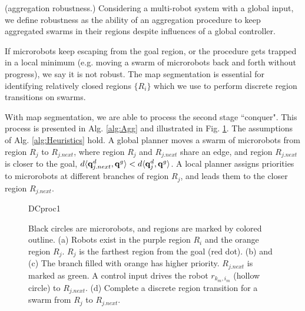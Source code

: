 \begin{definition}\label{def:robust}
	{\normalfont (aggregation robustness.)} Considering a multi-robot system with a global input, we define robustness as the ability of an aggregation procedure to keep aggregated swarms in their regions despite influences of a global controller.
\end{definition}

If microrobots keep escaping from the goal region, or the procedure gets trapped in a local minimum (e.g. moving a swarm of microrobots back and forth without progress), we say it is not robust. 
The map segmentation is essential for identifying relatively closed regions $\{R_i\}$ which we use to perform discrete region transitions on swarms.  
 

With map segmentation, we are able to process the second stage ``conquer". 
This process is presented in Alg. \ref{alg:Agg} and illustrated in Fig. \ref{fig:DCproc}. The assumptions of Alg. \ref{alg:Heuristics} hold. 
A global planner moves a swarm of microrobots from region $R_j$ to $R_{j.next}$, where region $R_j$ and $R_{j.next}$ share an edge, and region $R_{j.next}$ is closer to the goal, $d \langle {\bf q}^d_{j.next}, {\bf q}^g\rangle < d \langle {\bf q}^d_j, {\bf q}^g\rangle$. 
A local planner assigns priorities to microrobots at different branches of region $R_j$, and leads them to the closer region $R_{j.next}$.              

\begin{figure}[h]
	\vspace{1.8 mm}
	\centering
	\begin{overpic}[width=0.8\columnwidth]{DCproc1} %
	\end{overpic}
	
	\caption{\label{fig:DCproc} Black circles are microrobots, and regions are marked by colored outline. (a) Robots exist in the purple region $R_i$ and the orange region $R_j$. $R_j$ is the farthest region from the goal (red dot). (b) and (c) The branch filled with orange has higher priority. $R_{j.next}$ is marked as green. A control input drives the robot $r_{k_m,i_m}$ (hollow circle) to $R_{j.next}$. (d) Complete a discrete region transition for a swarm from $R_j$ to $R_{j.next}$.  }
\end{figure}


